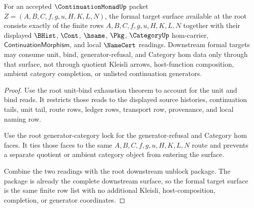 \begin{theorem}
\label{thm:continuation-monad-root-formal-target-surface}
For an accepted $\ContinuationMonadUp$ packet $Z=(A,B,C,f,g,u,H,K,L,N)$, the formal target surface available at the root consists exactly of the finite rows $A,B,C,f,g,u,H,K,L,N$ together with their displayed $\BHist$, $\Cont$, $\hsame$, $\Pkg$, $\CategoryUp$ hom-carrier, $\mathsf{ContinuationMorphism}$, and local $\NameCert$ readings. Downstream formal targets may consume unit, bind, generator-refusal, and Category hom data only through that surface, not through quotient Kleisli arrows, host-function composition, ambient category completion, or unlisted continuation generators.
\end{theorem}
\begin{proof}
Use the root unit-bind exhaustion theorem to account for the unit and bind reads. It restricts those reads to the displayed source histories, continuation tails, unit tail, route rows, ledger rows, transport row, provenance, and local naming row.

Use the root generator-category lock for the generator-refusal and Category hom faces. It ties those faces to the same $A,B,C,f,g,u,H,K,L,N$ route and prevents a separate quotient or ambient category object from entering the surface.

Combine the two readings with the root downstream unblock package. The package is already the complete downstream surface, so the formal target surface is the same finite row list with no additional Kleisli, host-composition, completion, or generator coordinates.
\end{proof}

